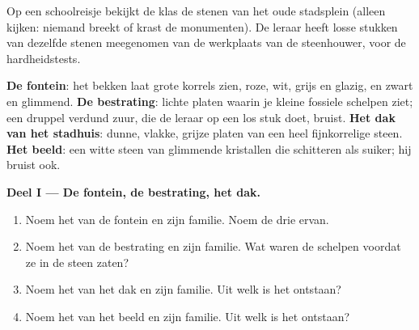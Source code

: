 \begin{problem}
\label{pb:g6:rocks-and-minerals:1}
Op een schoolreisje bekijkt de klas de stenen van het oude stadsplein
(alleen kijken: niemand breekt of krast de monumenten). De leraar heeft
losse stukken van dezelfde stenen meegenomen van de werkplaats van de
steenhouwer, voor de hardheidstests.

\smallskip
\noindent\textbf{De fontein}: het bekken laat grote korrels zien, roze,
        wit, grijs en glazig, en zwart en glimmend.
\textbf{De bestrating}: lichte platen waarin je kleine fossiele
        schelpen ziet; een druppel verdund zuur, die de leraar op een los
        stuk doet, bruist.
\textbf{Het dak van het stadhuis}: dunne, vlakke, grijze platen van
        een heel fijnkorrelige steen.
\textbf{Het beeld}: een witte steen van glimmende kristallen die
        schitteren als suiker; hij bruist ook.

\medskip
\noindent\textbf{Deel I --- De fontein, de bestrating, het dak.}
\begin{enumerate}
  \item Noem het  van de fontein en zijn familie. Noem de drie
         ervan.
  \item Noem het  van de bestrating en zijn familie. Wat waren
        de schelpen voordat ze in de steen zaten?
  \item Noem het  van het dak en zijn familie. Uit welk
         is het ontstaan?
  \item Noem het  van het beeld en zijn familie. Uit welk
         is het ontstaan?
\end{enumerate}


\end{problem}
